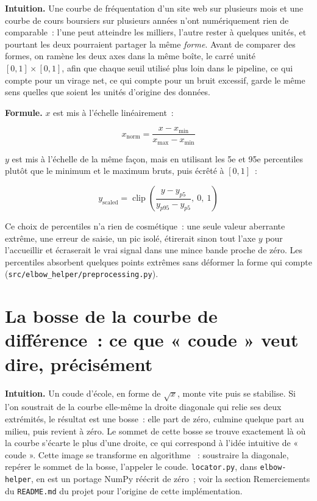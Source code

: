 \documentclass[11pt]{article}
\newcommand{\code}[1]{\texttt{#1}}
\begin{document}
\textbf{Intuition.} Une courbe de fréquentation d'un site web sur plusieurs
mois et une courbe de cours boursiers sur plusieurs années n'ont
numériquement rien de comparable~: l'une peut atteindre les milliers,
l'autre rester à quelques unités, et pourtant les deux pourraient partager
la même \emph{forme}. Avant de comparer des formes, on ramène les deux axes
dans la même boîte, le carré unité $[0,1] \times [0,1]$, afin que chaque
seuil utilisé plus loin dans le pipeline, ce qui compte pour un virage net,
ce qui compte pour un bruit excessif, garde le même sens quelles que soient
les unités d'origine des données.

\textbf{Formule.} $x$ est mis à l'échelle linéairement~:

\begin{equation}
x_{\text{norm}} = \frac{x - x_{\min}}{x_{\max} - x_{\min}}
\end{equation}

$y$ est mis à l'échelle de la même façon, mais en utilisant les 5e et 95e
percentiles plutôt que le minimum et le maximum bruts, puis écrêté à
$[0,1]$~:

\begin{equation}
y_{\text{scaled}} = \operatorname{clip}\!\left(\frac{y - y_{p5}}{y_{p95} - y_{p5}},\ 0,\ 1\right)
\end{equation}

Ce choix de percentiles n'a rien de cosmétique~: une seule valeur aberrante
extrême, une erreur de saisie, un pic isolé, étirerait sinon tout l'axe $y$
pour l'accueillir et écraserait le vrai signal dans une mince bande proche
de zéro. Les percentiles absorbent quelques points extrêmes sans déformer
la forme qui compte (\code{src/elbow\_helper/preprocessing.py}).

\section{La bosse de la courbe de différence~: ce que « coude » veut dire, précisément}

\textbf{Intuition.} Un coude d'école, en forme de $\sqrt{x}$, monte vite
puis se stabilise. Si l'on soustrait de la courbe elle-même la droite
diagonale qui relie ses deux extrémités, le résultat est une bosse~: elle
part de zéro, culmine quelque part au milieu, puis revient à zéro. Le
sommet de cette bosse se trouve exactement là où la courbe s'écarte le plus
d'une droite, ce qui correspond à l'idée intuitive de « coude ». Cette image
se transforme en algorithme \citep{satopaa2011}~: soustraire la diagonale,
repérer le sommet de la bosse, l'appeler le coude. \code{locator.py}, dans
\code{elbow-helper}, en est un portage NumPy réécrit de zéro~; voir la
section Remerciements du \code{README.md} du projet pour l'origine de cette
implémentation.
\end{document}

